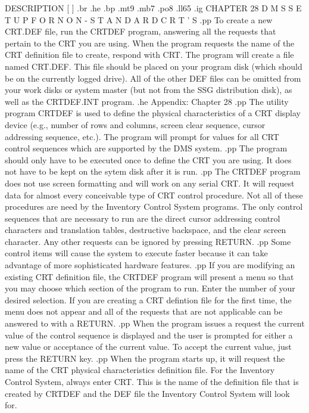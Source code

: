 		  DESCRIPTION [ 			]
.br
.he
.bp
.mt9
.mb7
.po8
.ll65
.ig
CHAPTER 28
D M S	S E T U P    F O R   N O N - S T A N D A R D   C R T ' S
.pp
To create a new CRT.DEF file, run the CRTDEF program, answering all the
requests that pertain to the CRT you are using.  When the program requests
the name of the CRT definition file to create, respond with CRT.  The
program will create a file named CRT.DEF.  This file should be placed on your
program disk (which should be on the currently logged drive).
All of the other DEF files can be omitted from your work disks or system
master (but not from the SSG distribution disk), as well as the CRTDEF.INT
program.
.he Appendix: Chapter 28
.pp
The utility program CRTDEF is used to define the physical characteristics of
a CRT display device (e.g., number of rows and columns, screen clear
sequence, cursor addressing sequence, etc.).  The program will prompt for
values for all CRT control sequences which are supported by the DMS system.
.pp
The program should only have to be executed once to define the CRT you are
using.	It does not have to be kept on the sytem disk after it is run.
.pp
The CRTDEF program does not use screen formatting and will work on any serial
CRT.  It will request data for almost every conceivable type of CRT control
procedure.  Not all of these procedures are need by the Inventory Control
System programs.  The only control sequences that are necessary to run are
the direct cursor addressing control characters and translation tables,
destructive backspace, and the clear screen character.	Any other requests
can be ignored by pressing RETURN.
.pp
Some control items will cause the system to execute faster because it can take
advantage of more sophisticated hardware features.
.pp
If you are modifying an existing CRT definition file, the CRTDEF program
will present a menu so that you may choose which section of the program to run.
Enter the number of your desired selection.  If you are creating a CRT
defintion file for the first time, the menu does not appear and all of the
requests that are not applicable can be answered to with a RETURN.
.pp
When the program issues a request  the current value of the control sequence
is displayed and the user is prompted for either a new value or acceptance
of the current value.	To accept the current value, just press the RETURN
key.
.pp
When the program starts up, it will request the name of the CRT physical
characteristics definition file.  For the Inventory Control System, always
enter CRT.  This is the name of the definition file that is created by
CRTDEF and the DEF file the Inventory Control System will look for.
